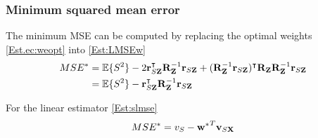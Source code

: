 \subsubsection{Minimum squared mean error}
 

{The minimum MSE can be computed by replacing the optimal weights \eqref{Est.ec:weopt} into
\eqref{Est:LMSEw}
\begin{align}
\label{Est:LMSEw}
MSE^* &= \mathbb{E}\{S^2\} 
     - 2 {\bf r}_{S{\bf Z}}^\intercal {{\bf R}_{\bf Z}^{-1}} {\bf r}_{S{\bf Z}}  
     + ({{\bf R}_{\bf Z}^{-1}} {\bf r}_{S{\bf Z}} )^\intercal {\bf R}_{\bf Z} 
       {{\bf R}_{\bf Z}^{-1}} {\bf r}_{S{\bf Z}}    \nonumber\\
    &= \mathbb{E}\{S^2\} 
     - {\bf r}_{S{\bf Z}}^\intercal {{\bf R}_{\bf Z}^{-1}} {\bf r}_{S{\bf Z}}  
\end{align}}

For the linear estimator \eqref{Est:slmse}
\begin{align}
MSE^* = v_S - {{\bf w}^*}^T {\bf v}_{S{\bf X}} 
\end{align}

